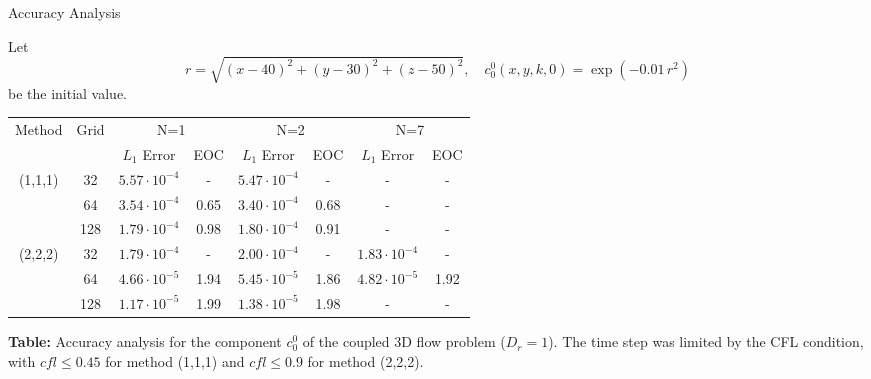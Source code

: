 
\begin{frame}{Accuracy Analysis}
	\scriptsize
	
	Let 
	\[
	r = \sqrt{(x-40)^2+(y-30)^2+(z-50)^2}, \quad
	c^0_0(x, y, k, 0) = \exp(-0.01 \, r^2)
	\] 
	be the initial value.
	
	\medskip
	\centering
	\begin{tabular}{|c|c|c|c|c|c|c|c|}
		\hline
		Method & Grid & \multicolumn{2}{c|}{N=1} & \multicolumn{2}{c|}{N=2} & \multicolumn{2}{c|}{N=7} \\
		\cline{3-8}
		&  & $L_1$ Error & EOC & $L_1$ Error & EOC & $L_1$ Error & EOC \\
		\hline
		(1,1,1) & 32  & $5.57\cdot10^{-4}$ & -    & $5.47\cdot10^{-4}$ & -    & - & - \\
		& 64  & $3.54\cdot10^{-4}$ & 0.65 & $3.40\cdot10^{-4}$ & 0.68 & - & - \\
		& 128 & $1.79\cdot10^{-4}$ & 0.98 & $1.80\cdot10^{-4}$ & 0.91 & - & - \\
		\hline
		(2,2,2) & 32  & $1.79\cdot10^{-4}$ & -    & $2.00\cdot10^{-4}$ & -    & $1.83\cdot10^{-4}$ & - \\
		& 64  & $4.66\cdot10^{-5}$ & 1.94 & $5.45\cdot10^{-5}$ & 1.86 & $4.82\cdot10^{-5}$ & 1.92 \\
		& 128 & $1.17\cdot10^{-5}$ & 1.99 & $1.38\cdot10^{-5}$ & 1.98 & - & - \\
		\hline
	\end{tabular}
	
	\vspace{0.5em}
    \footnotesize{
	\textbf{Table:} Accuracy analysis for the component $c^0_0$ of the coupled 3D flow problem ($D_r=1$). The time step was limited by the CFL condition, with $cfl \le 0.45$ for method (1,1,1) and $cfl \le 0.9$ for method (2,2,2).  
}
\end{frame}




